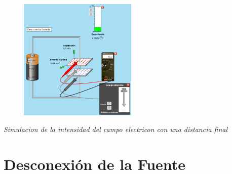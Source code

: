 \documentclass[12pt]{report}
\begin{document}
\begin{enumerate}
\begin{figure}[h]
    \centering
    \includegraphics[width=0.5\textwidth]{./images/2FOTO4.png}
\end{figure}
    \textit{Simulacion de la intensidad del campo electricon con una distancia final}
\end{enumerate}

\newpage 

\section{Desconexión de la Fuente}
\end{document}

